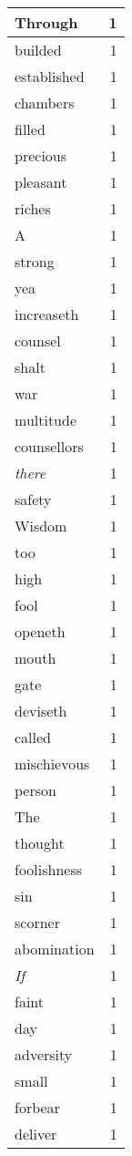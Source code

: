 \begin{center}
\begin{longtable}{l|r}
Through & 1\\ \hline 
builded & 1\\ \hline 
established & 1\\ \hline 
chambers & 1\\ \hline 
filled & 1\\ \hline 
precious & 1\\ \hline 
pleasant & 1\\ \hline 
riches & 1\\ \hline 
A & 1\\ \hline 
strong & 1\\ \hline 
yea & 1\\ \hline 
increaseth & 1\\ \hline 
counsel & 1\\ \hline 
shalt & 1\\ \hline 
war & 1\\ \hline 
multitude & 1\\ \hline 
counsellors & 1\\ \hline 
\emph{there} & 1\\ \hline 
safety & 1\\ \hline 
Wisdom & 1\\ \hline 
too & 1\\ \hline 
high & 1\\ \hline 
fool & 1\\ \hline 
openeth & 1\\ \hline 
mouth & 1\\ \hline 
gate & 1\\ \hline 
deviseth & 1\\ \hline 
called & 1\\ \hline 
mischievous & 1\\ \hline 
person & 1\\ \hline 
The & 1\\ \hline 
thought & 1\\ \hline 
foolishness & 1\\ \hline 
sin & 1\\ \hline 
scorner & 1\\ \hline 
abomination & 1\\ \hline 
\emph{If} & 1\\ \hline 
faint & 1\\ \hline 
day & 1\\ \hline 
adversity & 1\\ \hline 
small & 1\\ \hline 
forbear & 1\\ \hline 
deliver & 1\\ \hline 

\end{longtable}
\end{center}
